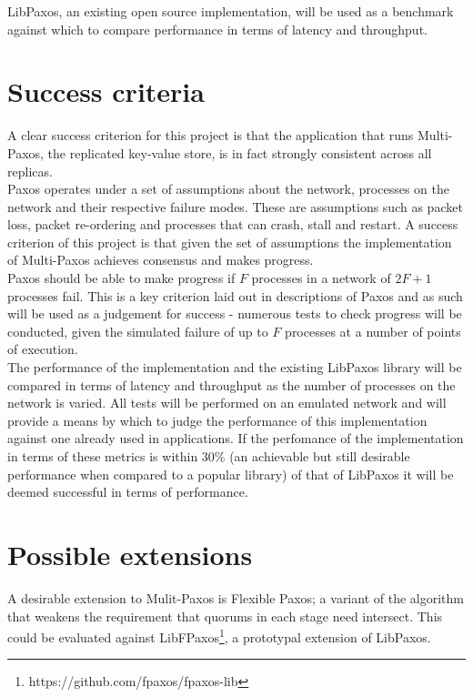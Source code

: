LibPaxos, an existing open source  implementation, will be used as a benchmark against which to compare performance in terms of latency and throughput.

\section*{Success criteria}
A clear success criterion for this project is that the application that runs Multi-Paxos, the replicated key-value store, is in fact strongly consistent across all replicas. \\

Paxos operates under a set of assumptions about the network, processes on the network and their respective failure modes. These are assumptions such as packet loss, packet re-ordering and processes that can crash, stall and restart. A success criterion of this project is that given the set of assumptions the implementation of Multi-Paxos achieves consensus and makes progress. \\

Paxos should be able to make progress if $F$ processes in a network of $2F + 1$ processes fail. This is a key criterion laid out in descriptions of Paxos and as such will be used as a judgement for success - numerous tests to check progress will be conducted, given the simulated failure of up to $F$ processes at a number of points of execution. \\

The performance of the implementation and the existing LibPaxos library will be compared in terms of latency and throughput as the number of processes on the network is varied. All tests will be performed on an emulated network and will provide a means by which to judge the performance of this implementation against one already used in applications. If the perfomance of the implementation in terms of these metrics is within 30\% (an achievable but still desirable performance when compared to a popular library) of that of LibPaxos it will be deemed successful in terms of performance. \\

\section*{Possible extensions}
A desirable extension to Mulit-Paxos is Flexible Paxos\cite{DBLP:journals/corr/HowardMS16}; a variant of the algorithm that weakens the requirement that quorums in each stage need intersect. This could be evaluated against LibFPaxos\footnote{https://github.com/fpaxos/fpaxos-lib}, a prototypal extension of LibPaxos. \\

